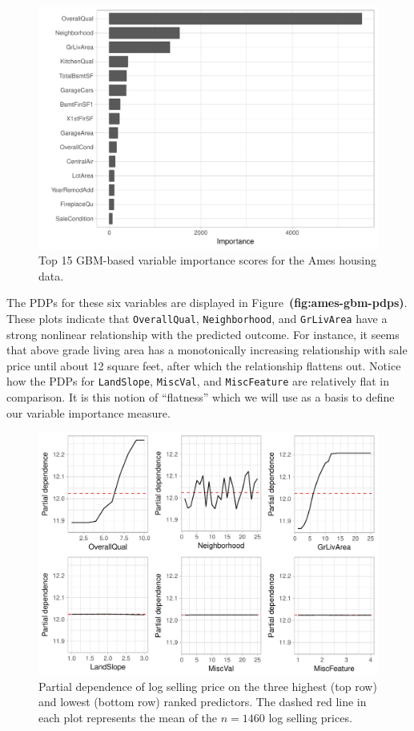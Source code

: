 \documentclass[12pt]{article}
\def\code#1{\texttt{#1}}
\def\ref#1{\textbf{(#1)}}
\begin{document}
\begin{figure}[!htb]
  \centering
  \includegraphics[width=1.0\textwidth]{ames-gbm-vip}
  \caption{Top 15 GBM-based variable importance scores for the Ames housing data. \label{fig:ames-gbm-vip}}
\end{figure}

The PDPs for these six variables are displayed in Figure~\ref{fig:ames-gbm-pdps}. These plots indicate that \code{OverallQual}, \code{Neighborhood}, and \code{GrLivArea} have a strong nonlinear relationship with the predicted outcome. For instance, it seems that above grade living area has a monotonically increasing relationship with sale price until about 12 square feet, after which the relationship flattens out. Notice how the PDPs for \code{LandSlope}, \code{MiscVal}, and \code{MiscFeature} are relatively flat in comparison. It is this notion of ``flatness'' which we will use as a basis to define our variable importance measure.

\begin{figure}[!htb]
  \centering
  \includegraphics[width=1.0\textwidth]{ames-gbm-pdps}
  \caption{Partial dependence of log selling price on the three highest (top row) and lowest (bottom row) ranked predictors. The dashed red line in each plot represents the mean of the $n = 1460$ log selling prices. \label{fig:ames-gbm-pdps}}
\end{figure}
\end{document}
